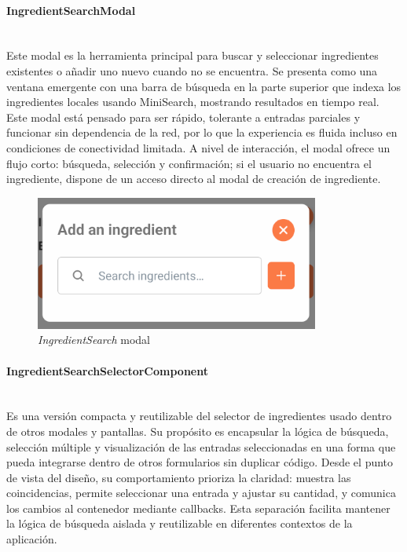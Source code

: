 \documentclass[twoside, openright, 11pt]{report}
\begin{document}
				\paragraph{IngredientSearchModal\\\\} \label{IngredientSearchModal}
					Este modal es la herramienta principal para buscar y seleccionar ingredientes existentes o añadir uno nuevo cuando no se encuentra. Se presenta como una ventana emergente con una barra de búsqueda en la parte superior que indexa los ingredientes locales usando MiniSearch, mostrando resultados en tiempo real. Este modal está pensado para ser rápido, tolerante a entradas parciales y funcionar sin dependencia de la red, por lo que la experiencia es fluida incluso en condiciones de conectividad limitada. A nivel de interacción, el modal ofrece un flujo corto: búsqueda, selección y confirmación; si el usuario no encuentra el ingrediente, dispone de un acceso directo al modal de creación de ingrediente.
					
					\begin{figure}[H]
						\centering
						\includegraphics{imagenes/IngredientSearchModal}
						\caption{\textit{IngredientSearch} modal}
						\label{fig:IngredientSearchModal}
					\end{figure}

				\paragraph{IngredientSearchSelectorComponent\\\\}
					Es una versión compacta y reutilizable del selector de ingredientes usado dentro de otros modales y pantallas. Su propósito es encapsular la lógica de búsqueda, selección múltiple y visualización de las entradas seleccionadas en una forma que pueda integrarse dentro de otros formularios sin duplicar código. Desde el punto de vista del diseño, su comportamiento prioriza la claridad: muestra las coincidencias, permite seleccionar una entrada y ajustar su cantidad, y comunica los cambios al contenedor mediante callbacks. Esta separación facilita mantener la lógica de búsqueda aislada y reutilizable en diferentes contextos de la aplicación.
					
\end{document}

